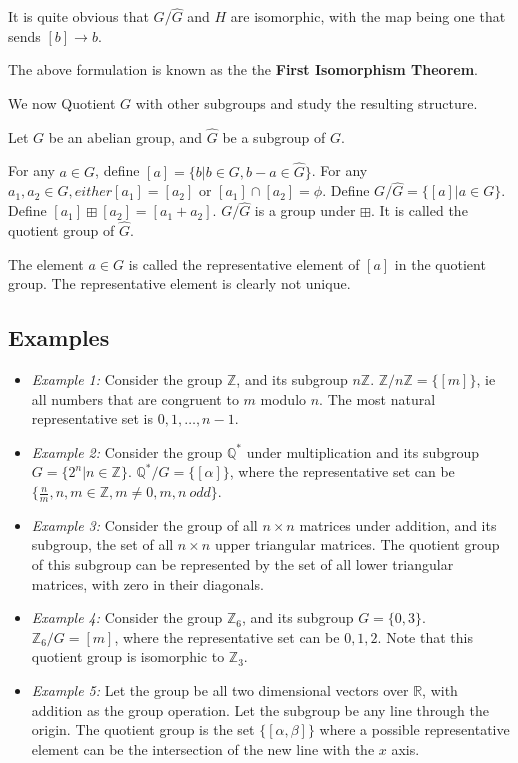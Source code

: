 It is quite obvious that $G \big/ \widehat{G}$ and $H$ are isomorphic, with the map being one that sends $[b] \rightarrow b$.
\par
The above formulation is known as the the \textbf{First Isomorphism Theorem}.
\par
We now Quotient $G$ with other subgroups and study the resulting structure.
\par
Let $G$ be an abelian group, and $\widehat{G}$ be a subgroup of $G$.
\par
For any $a \in G$, define $[a] = \{ b | b \in G, b - a \in \widehat{G} \}$.
For any $a_{1}, a_{2} \in G, either [a_{1}] = [a_{2}]$ or $[a_{1}] \cap [a_{2}] = \phi$.
Define $G \Big/ \widehat{G} = \{ [a] | a \in G \}$.
Define $[a_{1}] \boxplus [a_{2}] = [a_{1} + a_{2}]$.
$G \Big/ \widehat{G}$ is a group under $\boxplus$.
It is called the quotient group of $\widehat{G}$.
\par
The element $a \in G$ is called the representative element of $[a]$ in the quotient group.
The representative element is clearly not unique.
\subsection{Examples}
\begin{itemize}
  \item \emph{Example 1:} Consider the group $\mathbb{Z}$, and its subgroup $n \mathbb{Z}$. $\mathbb{Z} \Big/ n \mathbb{Z} = \{ [m] \}$, ie all numbers that are congruent to $m$ modulo $n$.
    The most natural representative set is ${0, 1, \dots , n-1}$.
  \item \emph{Example 2:} Consider the group $\mathbb{Q}^{*}$ under multiplication and its subgroup $G = \{ 2^{n} | n \in \mathbb{Z} \}$.
    $\mathbb{Q}^{*} \Big/ G = \{ [\alpha] \}$, where the representative set can be $ \{ \frac{n}{m} , n, m \in \mathbb{Z} , m \neq 0, m, n \ odd \}$.
  \item \emph{Example 3:} Consider the group of all $n \times n$ matrices under addition, and its subgroup, the set of all $n \times n$ upper triangular matrices.
    The quotient group of this subgroup can be represented by the set of all lower triangular matrices, with zero in their diagonals.
  \item \emph{Example 4:} Consider the group $\mathbb{Z}_{6}$, and its subgroup $G = \{ 0, 3 \} $.
    $\mathbb{Z}_{6} \Big/ G = {[m]}$, where the representative set can be ${0, 1, 2}$.
    Note that this quotient group is isomorphic to $\mathbb{Z}_{3}$.
  \item \emph{Example 5:} Let the group be all two dimensional vectors over $\mathbb{R}$, with addition as the group operation.
    Let the subgroup be any line through the origin.
    The quotient group is the set $ \{ [\alpha, \beta ]\}$ where a possible representative element can be the intersection of the new line with the $x$ axis.
\end{itemize}
